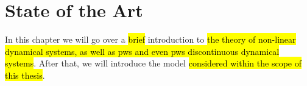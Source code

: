 \chapter{State of the Art}
\label{chap:state}

In this chapter we will go over a \hl{brief} introduction to \hl{the theory of non-linear dynamical systems, as well as \gls{pws} and even \gls{pws} discontinuous dynamical systems}.
After that, we will introduce the model \hl{considered within the scope of this thesis}.






%

